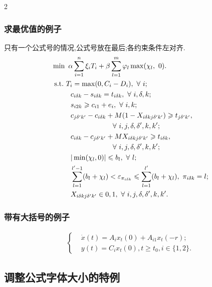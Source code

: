 \documentclass[authordraft]{ctacn}%
\begin{document}
\begin{multicols}{2}
\subsubsection{求最优值的例子}
只有一个公式号的情况,公式号放在最后;各约束条件左对齐.
\begin{align}
&\min~\alpha\sum\limits_{i=1}^n\xi_{i}T_{i}+\beta \sum\limits_{l=1}^m \varphi_{l} \max(\chi_{l},~0).\notag\\
&{\rm{~s.t.~}}T_{i}=\max(0,C_i-D_i),~\forall~i;\notag\\
&~~~~~~~~c_{i \delta k}-s_{i \delta k}=t_{i \delta k},~\forall~i,\delta,k;\notag\\
&~~~~~~~~s_{i 2 k}\geqslant c_{i 1 }+e_i,~\forall~i,k;\notag\\
&~~~~~~~~c_{j \delta' k'}-c_{i \delta k}+M(1-X_{i \delta k j\delta'k'})\geqslant t_{j \delta' k'},\notag\\
&~~~~~~~~~~~~~~~~~~~~~~~~~~\forall~i,j,\delta,\delta',k,k';\notag\\
&~~~~~~~~c_{i \delta k}-c_{j \delta' k'}+M X_{i \delta k j\delta'k'}\geqslant t_{i \delta k},\notag\\
&~~~~~~~~~~~~~~~~~~~~~~~~~~\forall~i,j,\delta,\delta',k,k';\notag\\
&~~~~~~~~|\min(\chi_{l},0)|\leqslant b_l,~\forall~ l;\notag\\
&~~~~~~~~\sum\limits_{l=1}^{l'-1} (b_{l}+\chi_{l})< \varepsilon_{\pi_{i \delta k}}\leqslant  \sum\limits_{l=1}^{l'} (b_{l}+\chi_{l}),~\pi_{i \delta k}=l;\notag\\
&~~~~~~~~X_{i \delta k j\delta'k'} \in {0,1},~\forall~ i,j,\delta,\delta',k,k'.
\end{align}


\subsubsection{带有大括号的例子}\vspace{-15pt}
\begin{align}
\left\{\begin{aligned}
&\dot{x}(t)=A_{i}x_{t}(0)+A_{i1}x_{t}(-r);\\
&y(t)=C_{i}x_{t}(0),t\geqslant t_{0}, i\in\{1, 2\}.
\end{aligned}\right.
\end{align}


\subsection{调整公式字体大小的特例}


\end{multicols}
\end{document}
